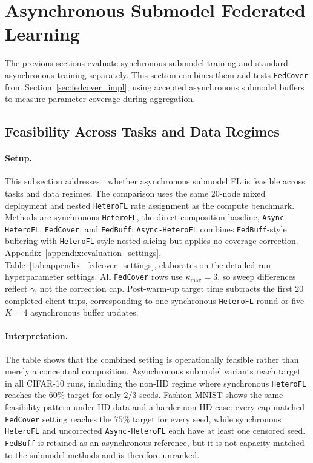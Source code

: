 \FloatBarrier
\section{Asynchronous Submodel Federated Learning}
\label{sec:eval_async_submodel_fl}

The previous sections evaluate synchronous submodel training and standard asynchronous training separately. This section combines them and tests \texttt{FedCover} from Section~\ref{sec:fedcover_impl}, using accepted asynchronous submodel buffers to measure parameter coverage during aggregation.

\FloatBarrier
\subsection{Feasibility Across Tasks and Data Regimes}

\paragraph{Setup.}
This subsection addresses : whether asynchronous submodel FL is feasible across tasks and data regimes. The comparison uses the same \(20\)-node mixed deployment and nested \texttt{HeteroFL} rate assignment as the compute benchmark. Methods are synchronous \texttt{HeteroFL}, the direct-composition baseline, \texttt{Async-HeteroFL}, \texttt{FedCover}, and \texttt{FedBuff}; \texttt{Async-HeteroFL} combines \texttt{FedBuff}-style buffering with \texttt{HeteroFL}-style nested slicing but applies no coverage correction. Appendix~\ref{appendix:evaluation_settings}, Table~\ref{tab:appendix_fedcover_settings}, elaborates on the detailed run hyperparameter settings. All \texttt{FedCover} rows use \(\kappa_{\max}=3\), so sweep differences reflect \(\gamma\), not the correction cap. Post-warm-up target time subtracts the first \(20\) completed client trips, corresponding to one synchronous \texttt{HeteroFL} round or five \(K=4\) asynchronous buffer updates.

\paragraph{Interpretation.}
The table shows that the combined setting is operationally feasible rather than merely a conceptual composition. Asynchronous submodel variants reach target in all CIFAR-10 runs, including the non-IID regime where synchronous \texttt{HeteroFL} reaches the \(60\%\) target for only \(2/3\) seeds. Fashion-MNIST shows the same feasibility pattern under IID data and a harder non-IID case: every cap-matched \texttt{FedCover} setting reaches the \(75\%\) target for every seed, while synchronous \texttt{HeteroFL} and uncorrected \texttt{Async-HeteroFL} each have at least one censored seed. \texttt{FedBuff} is retained as an asynchronous reference, but it is not capacity-matched to the submodel methods and is therefore unranked.


